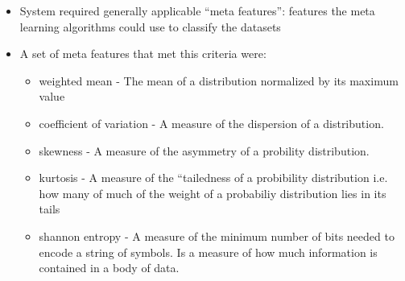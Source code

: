 \documentclass{beamer}
\begin{document}
\begin{frame}[t]
  \begin{itemize}
      \item System required generally applicable ``meta features'': features the
        meta learning algorithms could use to classify the datasets
      \item A set of meta features that met this criteria were:
        \begin{itemize}
        \item weighted mean - The mean of a distribution normalized by its
                 maximum value
               \item coefficient of variation - A measure of the dispersion of a
                 distribution.
               \item skewness - A measure of the asymmetry of a probility
                 distribution.
                \item kurtosis - A measure of the ``tailedness of a probibility
                  distribution i.e. how many of much of the weight of a probabiliy
                  distribution lies in its tails
                \item shannon entropy - A measure of the minimum number of bits
                  needed to encode a string of symbols. Is a measure of how much
                  information is contained in a body of data.
        \end{itemize}
  \end{itemize}
\end{frame}
\end{document}

